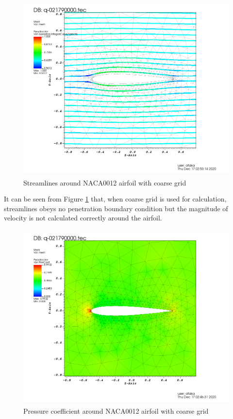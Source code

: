 \documentclass[letterpaper,12pt]{article}
\begin{document}
\begin{figure} [!h]
	\centering
	\includegraphics[height = 9.5cm]{graph/coarse/coarse_streamline0000.png}
	\caption{Streamlines around NACA0012 airfoil with coarse grid}
    \label{fig:airfoilcoarsestreamline}
\end{figure}

\newpage

It can be seen from Figure \ref{fig:airfoilcoarsestreamline} that, when coarse grid is 
used for calculation, streamlines obeys no penetration boundary condition but the magnitude 
of velocity is not calculated correctly around the airfoil.

\vspace{1cm}

\begin{figure} [!h]
	\centering
	\includegraphics[height = 9.5cm]{graph/coarse/coarse_pressure0000.png}
	\caption{Pressure coefficient around NACA0012 airfoil with coarse grid}
    \label{fig:airfoilcoarsepressure}
\end{figure}
\end{document}
